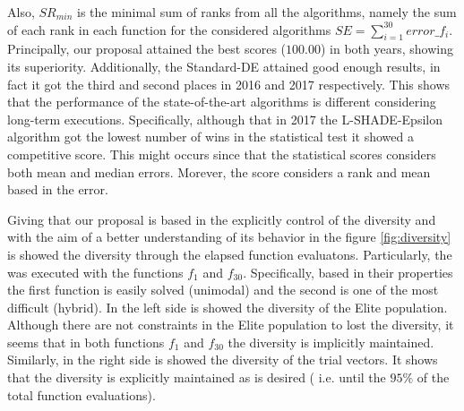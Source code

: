 %
Also, $SR_{min}$ is the minimal sum of ranks from all the algorithms, namely the sum of each rank in each function for the considered algorithms $SE = \sum_{i=1}^{30} error\_f_i$.
%
% 
Principally, our proposal attained the best scores ($100.00$) in both years, showing its superiority.
%
Additionally, the Standard-DE attained good enough results, in fact it got the third and second places in \CEC{} 2016 and \CEC{} 2017 respectively.
%
This shows that the performance of the state-of-the-art algorithms is different considering long-term executions.
%
Specifically, although that in \CEC{} 2017 the L-SHADE-Epsilon algorithm got the lowest number of wins in the statistical test it showed a competitive score.
%
This might occurs since that the statistical scores considers both mean and median errors.
%
Morever, the score considers a rank and mean based in the error.
%


Giving that our proposal is based in the explicitly control of the diversity and with the aim of a better understanding of its behavior in the figure \ref{fig:diversity} is showed the diversity through the elapsed function evaluatons.
%
Particularly, the \DEEDM{} was executed with the functions $f_1$ and $f_{30}$.
%
Specifically, based in their properties the first function is easily solved (unimodal) and the second is one of the most difficult (hybrid).
%
In the left side is showed the diversity of the Elite population.
%
Although there are not constraints in the Elite population to lost the diversity, it seems that in both functions $f_1$ and $f_{30}$ the diversity is implicitly maintained.
%
Similarly, in the right side is showed the diversity of the trial vectors.
%
It shows that the diversity is explicitly maintained as is desired ( i.e. until the $95\%$ of the total function evaluations).

